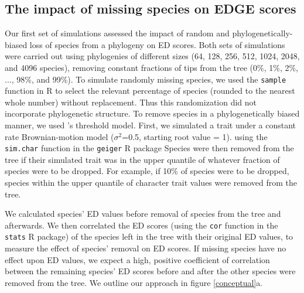 \documentclass[12pt,english]{article}
\begin{document}
\subsection*{The impact of missing species on EDGE scores}
Our first set of simulations assessed the impact of random and
phylogenetically-biased loss of species from a phylogeny on ED scores. Both sets
of simulations were carried out using phylogenies of different sizes (64, 128, 256, 512, 1024, 2048, and 4096 species), removing constant fractions of tips from
the tree (0\%, 1\%, 2\%, ..., 98\%, and 99\%). To simulate randomly missing
species, we used the \texttt{sample} function in R to select the relevant
percentage of species (rounded to the nearest whole number) without replacement.
Thus this randomization did not incorporate phylogenetic structure. To remove
species in a phylogenetically biased manner, we used
\textcite{Felsenstein2005}'s threshold model. First, we simulated a trait under
a constant rate Brownian-motion model ($\sigma^2$=0.5, starting root value = 1).
using the \texttt{sim.char} function in the \texttt{geiger} R package
\autocite{Pennell2014} Species were then removed from the tree if their
simulated trait was in the upper quantile of whatever fraction of species were
to be dropped. For example, if 10\% of species were to be dropped, species
within the upper  quantile of character trait values were removed from
the tree. 

We calculated species' ED values before removal of species from the tree and
afterwards. We then correlated the ED scores (using the \texttt{cor} function in
the \texttt{stats} R package) of the species left in the tree with their
original ED values, to measure the effect of species' removal on ED scores. If missing species have no effect upon ED values, we
expect a high, positive coefficient of correlation between the remaining
species' ED scores before and after the other species were removed from the
tree. We outline our approach in figure \ref{conceptual}a.
\end{document}
